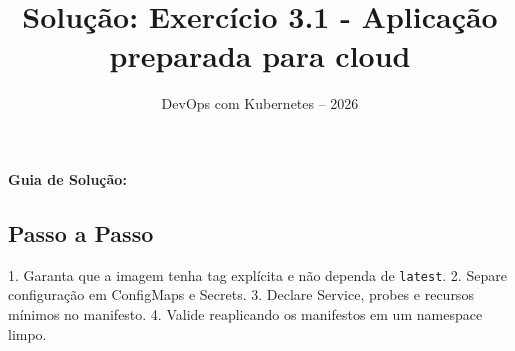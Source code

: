 \documentclass[11pt,a4paper]{article}
\title{\color{secondary}\Huge\textbf{Solução: Exercício 3.1 - Aplicação preparada para cloud}}
\author{\color{primary}DevOps com Kubernetes -- 2026}
\date{}
\begin{document}
\maketitle


\textbf{Guia de Solução:}

\subsection*{\color{secondary}Passo a Passo}

1. Garanta que a imagem tenha tag explícita e não dependa de \texttt{latest}.
2. Separe configuração em ConfigMaps e Secrets.
3. Declare Service, probes e recursos mínimos no manifesto.
4. Valide reaplicando os manifestos em um namespace limpo.
\end{document}
